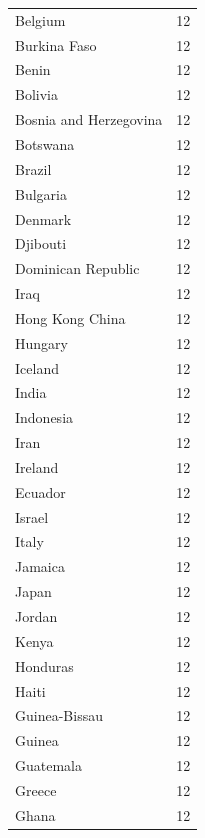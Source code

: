 \documentclass[
  letterpaper,
  DIV=11,
  numbers=noendperiod]{scrreprt}
\begin{document}
\begin{tabular}{lr}
Belgium                  &       12 \\
Burkina Faso             &       12 \\
Benin                    &       12 \\
Bolivia                  &       12 \\
Bosnia and Herzegovina   &       12 \\
Botswana                 &       12 \\
Brazil                   &       12 \\
Bulgaria                 &       12 \\
Denmark                  &       12 \\
Djibouti                 &       12 \\
Dominican Republic       &       12 \\
Iraq                     &       12 \\
Hong Kong China          &       12 \\
Hungary                  &       12 \\
Iceland                  &       12 \\
India                    &       12 \\
Indonesia                &       12 \\
Iran                     &       12 \\
Ireland                  &       12 \\
Ecuador                  &       12 \\
Israel                   &       12 \\
Italy                    &       12 \\
Jamaica                  &       12 \\
Japan                    &       12 \\
Jordan                   &       12 \\
Kenya                    &       12 \\
Honduras                 &       12 \\
Haiti                    &       12 \\
Guinea-Bissau            &       12 \\
Guinea                   &       12 \\
Guatemala                &       12 \\
Greece                   &       12 \\
Ghana                    &       12 \\

\end{tabular}
\end{document}
